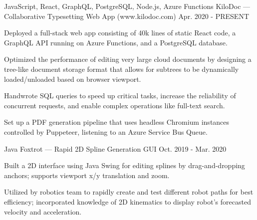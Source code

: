 
\begin{cventries}
  \cventry
  {JavaScript, React, GraphQL, PostgreSQL, Node.js, Azure Functions} %
  {KiloDoc --- Collaborative Typesetting Web App (www.kilodoc.com)} %
  {} %
  {Apr. 2020 - PRESENT} %
  {
    \begin{cvitems} %
      \item {Deployed a full-stack web app consisting of 40k lines of static React code, a GraphQL API running on Azure Functions, and a PostgreSQL database.}
      \item {Optimized the performance of editing very large cloud documents by designing a tree-like document storage format that allows for subtrees to be dynamically loaded/unloaded based on browser viewport.}
      \item {Handwrote SQL queries to speed up critical tasks, increase the reliability of concurrent requests, and enable complex operations like full-text search.}
      \item {Set up a PDF generation pipeline that uses headless Chromium instances controlled by Puppeteer, listening to an Azure Service Bus Queue.}
    \end{cvitems}
  }

  \cventry
  {Java} %
  {Foxtrot --- Rapid 2D Spline Generation GUI} %
  {} %
  {Oct. 2019 - Mar. 2020} %
  {
    \begin{cvitems} %
      \item {Built a 2D interface using Java Swing for editing splines by drag-and-dropping anchors; supports viewport x/y translation and zoom.}
      \item {Utilized by robotics team to rapidly create and test different robot paths for best efficiency; incorporated knowledge of 2D kinematics to display robot's forecasted velocity and acceleration.}
    \end{cvitems}
  }
\end{cventries}
